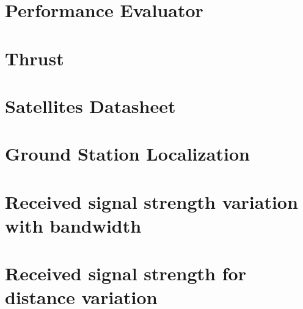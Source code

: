 \section{Performance Evaluator}
\label{PerformanceEvaluator}


\section{Thrust}
\label{Thrust}



\section{Satellites Datasheet}
\label{SatsDatashhet}


\section{Ground Station Localization}
\label{GSLocalization}



%
\section{Received signal strength variation with bandwidth}
\label{BvsS}




\section{Received signal strength for distance variation}
\label{friisCalc}




